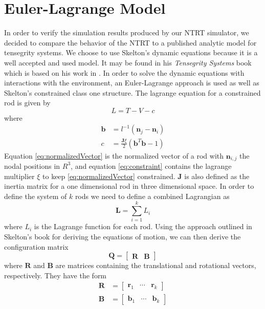 \section{Euler-Lagrange Model}
In order to verify the simulation results produced by our NTRT simulator, we decided to compare the behavior of the NTRT to a published analytic model for tensegrity systems.
We choose to use Skelton's dynamic equations because it is a well accepted and used model.
It may be found in his \emph{Tensegrity Systems} book \cite{skelton_tensegrity_2009} which is based on his work in \cite{skelton2005dynamics}.
In order to solve the dynamic equations with interactions with the environment, an Euler-Lagrange approach is used as well as Skelton's constrained class one structure.
The lagrange equation for a constrained rod is given by
\begin{equation}
\label{eq:lagrange}
L = T - V - c
\end{equation}
where
\begin{align}
\mathbf{b} &= l^{-1}(\mathbf{n}_{j}-\mathbf{n}_{i})\label{eq:normalizedVector}\\
c &= \frac{\mathbf{J}\xi}{2}(\mathbf{b}^{T}\mathbf{b}-1)\label{eq:constraint}
\end{align} 
Equation \eqref{eq:normalizedVector} is the normalized vector of a rod with \(\mathbf{n}_{i,j}\) the nodal positions in \(R^3\), and equation \eqref{eq:constraint} contains the lagrange multiplier \(\xi\) to keep \eqref{eq:normalizedVector} constrained.
\(\mathbf{J}\) is also defined as the inertia matrix for a one dimensional rod in three dimensional space.
In order to define the system of \(k\) rods we need to define a combined Lagrangian as
\begin{equation}
\mathbf{L} = \sum_{i=1}^{k} L_{i}\label{eq:combinedLagrangian}
\end{equation}
where \(L_{i}\) is the Lagrange function for each rod.
Using the approach outlined in Skelton's book for deriving the equations of motion, we can then derive the configuration matrix
\begin{equation}
\mathbf{Q} = \begin{bmatrix}
	\mathbf{R} & \mathbf{B}
	\end{bmatrix}\label{eq:configMatrix}
\end{equation}
where \(\mathbf{R}\) and \(\mathbf{B}\) are matrices containing the translational and rotational vectors, respectively. They have the form
\begin{align}
\mathbf{R} &= \begin{bmatrix}
	\mathbf{r}_{1} & \cdots & \mathbf{r}_{k}
	\end{bmatrix}\label{eq:transR}\\
\mathbf{B} &= \begin{bmatrix}
	\mathbf{b}_{1} & \cdots & \mathbf{b}_{k}
	\end{bmatrix}\label{eq:rotB}
\end{align}
